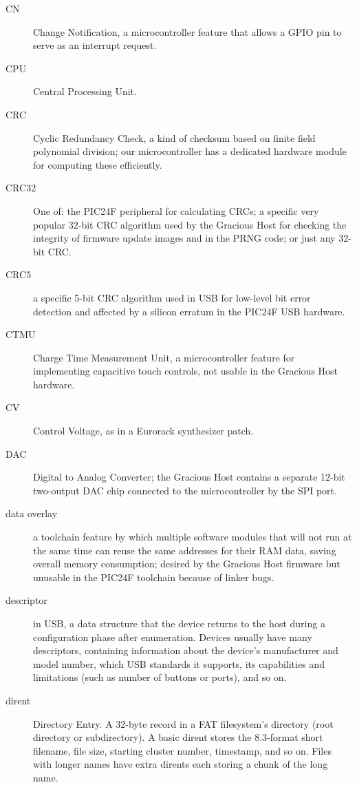 \begin{description}
\item[CN] Change Notification, a microcontroller feature that allows a GPIO
pin to serve as an interrupt request.

\item[CPU] Central Processing Unit.

\item[CRC] Cyclic Redundancy Check, a kind of checksum based on finite field
polynomial division; our microcontroller has a dedicated hardware module for
computing these efficiently.

\item[CRC32] One of:  the PIC24F peripheral for calculating CRCs; a specific
very popular 32-bit CRC algorithm used by the Gracious Host for checking the
integrity of firmware update images and in the PRNG code; or just any 32-bit
CRC.

\item[CRC5] a specific 5-bit CRC algorithm used in USB for low-level bit
error detection and affected by a silicon erratum in the PIC24F USB
hardware.

\item[CTMU] Charge Time Measurement Unit, a microcontroller feature for
implementing capacitive touch controls, not usable in the Gracious Host
hardware.

\item[CV] Control Voltage, as in a Eurorack synthesizer patch.

\item[DAC] Digital to Analog Converter; the Gracious Host contains a
separate 12-bit two-output DAC chip connected to the microcontroller
by the SPI port.

\item[data overlay] a toolchain feature by which multiple software modules
that will not run at the same time can reuse the same addresses for their
RAM data, saving overall memory consumption; desired by the Gracious Host
firmware but unusable in the PIC24F toolchain because of linker bugs.

\item[descriptor] in USB, a data structure that the device returns to the
host during a configuration phase after enumeration.  Devices usually have
many descriptors, containing information about the device's manufacturer and
model number, which USB standards it supports, its capabilities and
limitations (such as number of buttons or ports), and so on.

\item[dirent] Directory Entry.  A 32-byte record in a FAT filesystem's
directory (root directory or subdirectory).  A basic dirent stores the
8.3-format short filename, file size, starting cluster number, timestamp,
and so on.  Files with longer names have extra dirents each
storing a chunk of the long name.


\end{description}
